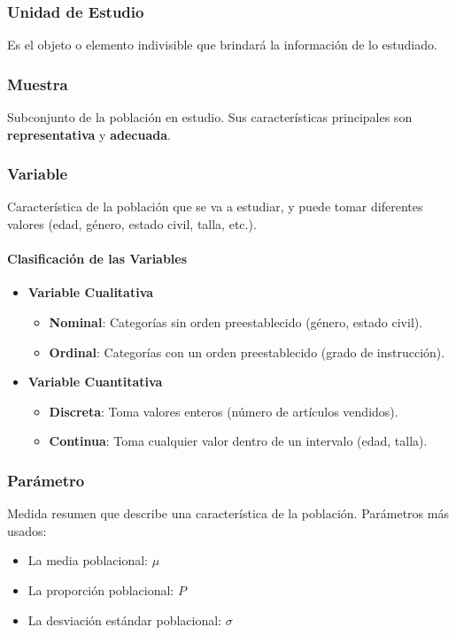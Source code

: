 \documentclass{article}
\begin{document}
        \subsubsection{Unidad de Estudio}
            Es el objeto o elemento indivisible que brindará la información de lo estudiado.

        \subsubsection{Muestra}
            Subconjunto de la población en estudio. Sus características principales son \textbf{representativa} y \textbf{adecuada}.

        \subsubsection{Variable}
            Característica de la población que se va a estudiar, y puede tomar diferentes valores (edad, género, estado civil, talla, etc.).

            \paragraph{Clasificación de las Variables}
            \begin{itemize}[label=-]
            \item \textbf{Variable Cualitativa}
            \begin{itemize}
            \item \textbf{Nominal}: Categorías sin orden preestablecido (género, estado civil).
            \item \textbf{Ordinal}: Categorías con un orden preestablecido (grado de instrucción).
            \end{itemize}

            \item \textbf{Variable Cuantitativa}
            \begin{itemize}
            \item \textbf{Discreta}: Toma valores enteros (número de artículos vendidos).
            \item \textbf{Continua}: Toma cualquier valor dentro de un intervalo (edad, talla).
            \end{itemize}
            \end{itemize}

        \subsubsection{Parámetro}
            Medida resumen que describe una característica de la población.
            Parámetros más usados:
            \begin{itemize}
            \item La media poblacional: $\mu$
            \item La proporción poblacional: $P$
            \item La desviación estándar poblacional: $\sigma$
            \end{itemize}
\end{document}

